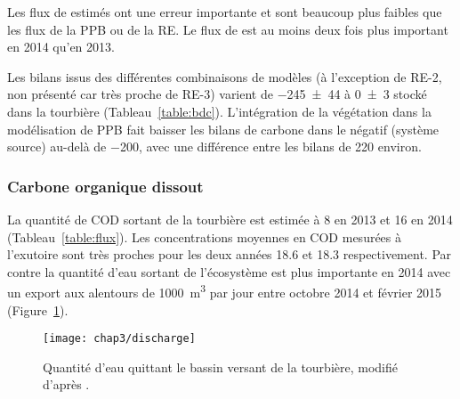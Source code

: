 Les flux de \chh estimés ont une erreur importante et sont beaucoup plus faibles que les flux de la PPB ou de la RE.
Le flux de \chh est au moins deux fois plus important en 2014 qu'en 2013.

Les bilans issus des différentes combinaisons de modèles (à l'exception de RE-2, non présenté car très proche de RE-3) varient de \SI{-245(44)}{\gcma} à \SI{0(3)}{\gcma} stocké dans la tourbière (Tableau~\ref{table:bdc}).
L'intégration de la végétation dans la modélisation de PPB fait baisser les bilans de carbone dans le négatif (système source) au-delà de \SI{-200}{\gcma}, avec une différence entre les bilans de \SI{220}{\gcma} environ.




\subsubsection{Carbone organique dissout}

La quantité de COD sortant de la tourbière est estimée à \SI{8}{\gcma} en 2013 et \SI{16}{\gcma} en 2014 (Tableau~\ref{table:flux}).
Les concentrations moyennes en COD mesurées à l'exutoire sont très proches pour les deux années \num{18.6} et \SI{18.3}{\mgl} respectivement.
Par contre la quantité d'eau sortant de l'écosystème est plus importante en 2014 avec un export aux alentours de \SI{1000}{\cubic\metre} par jour entre octobre 2014 et février 2015 (Figure~\ref{fig:discharge}).

\begin{figure}
\centering
\texttt{[image: chap3/discharge]}
\caption{Quantité d'eau quittant le bassin versant de la tourbière, modifié d'après \citet{binet2013}.}
\label{fig:discharge}
\end{figure}


